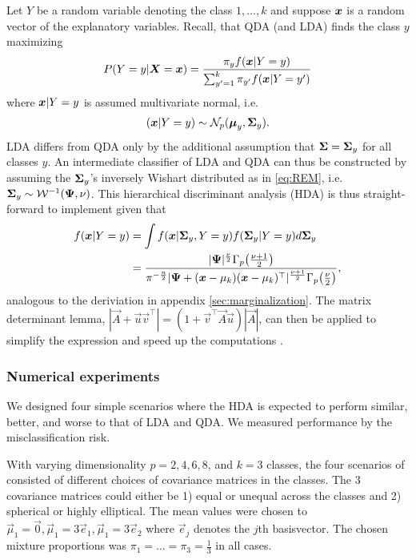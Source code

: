\documentclass{article}\usepackage[]{graphicx}\usepackage[]{color}
\begin{document}
Let $Y$ be a random variable denoting the class $1, ..., k$ and suppose ${\boldsymbol{x}}$ is a random vector of the explanatory variables. Recall, that QDA (and LDA) finds the class $y$ maximizing
\begin{align*}
  P(Y = y | {\boldsymbol{X}} = {\boldsymbol{x}}) =
    \frac{\pi_y f({\boldsymbol{x}} | Y = y)}
         {\sum_{y' = 1}^k \pi_{y'} f({\boldsymbol{x}} | Y = y')}
\end{align*}
where ${\boldsymbol{x}} | Y = y$ is assumed multivariate normal, i.e.\
\begin{align*}
  ({\boldsymbol{x}} | Y = y) \sim \mathcal{N}_p(\boldsymbol{\mu}_y, {\boldsymbol{\Sigma}}_y).
\end{align*}
LDA differs from QDA only by the additional assumption that ${\boldsymbol{\Sigma}} = {\boldsymbol{\Sigma}}_y$ for all classes $y$. An intermediate classifier of LDA and QDA can thus be constructed by assuming the ${\boldsymbol{\Sigma}}_y$'s inversely Wishart distributed as in \eqref{eq:REM}, i.e.\ ${\boldsymbol{\Sigma}}_y \sim \mathcal{W}^{-1}({\boldsymbol{\Psi}}, \nu)$. This hierarchical discriminant analysis (HDA) is thus straight-forward to implement given that
\begin{align*}
f({\boldsymbol{x}} | Y = y)
  &= \int f({\boldsymbol{x}}| {\boldsymbol{\Sigma}}_y, Y = y) f({\boldsymbol{\Sigma}}_y | Y = y) d{\boldsymbol{\Sigma}}_y \\
  &= \frac{ |{\boldsymbol{\Psi}}|^{\frac{\nu}{2}} \Gamma_p\!\left(\frac{\nu + 1}{2}\right) }
          { \pi^{-\frac{n}{2}} |{\boldsymbol{\Psi}} + ({\boldsymbol{x}}-\mu_k)({\boldsymbol{x}}-\mu_k)^\top|^{\frac{\nu + 1}{2}}
            \Gamma_p\!\left(\frac{\nu}{2}\right)},
\end{align*}
analogous to the deriviation in appendix \ref{sec:marginalization}. The matrix determinant lemma, $|\vec{A} + \vec{u}\vec{v}^\top| = (1 + \vec{v}^\top\vec{A}\vec{u})|\vec{A}|$, can then be applied to simplify the expression and speed up the computations \citep{Ding2007}.

\subsubsection{Numerical experiments}
We designed four simple scenarios where the HDA is expected to perform similar, better, and worse to that of LDA and QDA. We measured performance by the misclassification risk.

With varying dimensionality $p = 2, 4, 6, 8$, and $k = 3$ classes, the four scenarios of consisted of different choices of covariance matrices in the classes. The 3 covariance matrices could either be 1) equal or unequal across the classes and 2) spherical or highly elliptical.
The mean values were chosen to $\vec{\mu}_1 = \vec{0}, \vec{\mu}_1 = 3\vec{e}_1, \vec{\mu}_1 = 3\vec{e}_2$ where $\vec{e}_j$ denotes the $j$th basisvector. The chosen mixture proportions was $\pi_1 = ... = \pi_3 = \frac{1}{3}$ in all cases.
\end{document}
